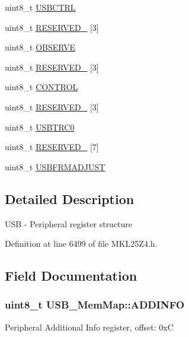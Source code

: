 \begin{DoxyCompactItemize}
\begin{tabbing}
\end{tabbing}\item 
uint8\+\_\+t \hyperlink{struct_u_s_b___mem_map_a593a3dc10eb92a0dab6f62dbda5f0209}{U\+S\+B\+C\+T\+RL}
\item 
uint8\+\_\+t \hyperlink{struct_u_s_b___mem_map_afe66a08c7da472a7374ac05a5d0fd712}{R\+E\+S\+E\+R\+V\+E\+D\+\_} \mbox{[}3\mbox{]}
\item 
uint8\+\_\+t \hyperlink{struct_u_s_b___mem_map_a1bf837fd42e907a712c9f8e7261ea10d}{O\+B\+S\+E\+R\+VE}
\item 
uint8\+\_\+t \hyperlink{struct_u_s_b___mem_map_ab40fcbbe084ce769cd4c160da7823f8c}{R\+E\+S\+E\+R\+V\+E\+D\+\_} \mbox{[}3\mbox{]}
\item 
uint8\+\_\+t \hyperlink{struct_u_s_b___mem_map_a98ff4d7ab9c41c673ee41053dc484447}{C\+O\+N\+T\+R\+OL}
\item 
uint8\+\_\+t \hyperlink{struct_u_s_b___mem_map_a6f64544a4aa0f7b68d02d2df9c3cb47c}{R\+E\+S\+E\+R\+V\+E\+D\+\_} \mbox{[}3\mbox{]}
\item 
uint8\+\_\+t \hyperlink{struct_u_s_b___mem_map_a10d494a848ee49ff264d62eb0bfb439e}{U\+S\+B\+T\+R\+C0}
\item 
uint8\+\_\+t \hyperlink{struct_u_s_b___mem_map_a2938cb654f5998a782bc2a59916ed6cc}{R\+E\+S\+E\+R\+V\+E\+D\+\_} \mbox{[}7\mbox{]}
\item 
uint8\+\_\+t \hyperlink{struct_u_s_b___mem_map_a1bb1b3975dfcbbe78635e2d08b16553d}{U\+S\+B\+F\+R\+M\+A\+D\+J\+U\+ST}
\end{DoxyCompactItemize}


\subsection{Detailed Description}
U\+SB -\/ Peripheral register structure 

Definition at line 6499 of file M\+K\+L25\+Z4.\+h.



\subsection{Field Documentation}
\subsubsection[{\texorpdfstring{A\+D\+D\+I\+N\+FO}{ADDINFO}}]{\setlength{\rightskip}{0pt plus 5cm}uint8\+\_\+t U\+S\+B\+\_\+\+Mem\+Map\+::\+A\+D\+D\+I\+N\+FO}\hypertarget{struct_u_s_b___mem_map_aa87a73875ff45abb9b84992687f48000}{}\label{struct_u_s_b___mem_map_aa87a73875ff45abb9b84992687f48000}
Peripheral Additional Info register, offset\+: 0xC 

